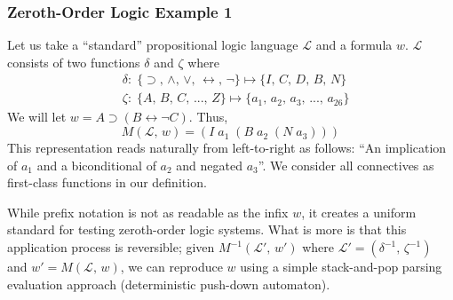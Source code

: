 \documentclass[ms]{uncgdissertationexp2}
\theoremstyle{plain}
\theoremstyle{definition}
\theoremstyle{remark}
\begin{document}
\subsubsection{Zeroth-Order Logic Example 1}
\label{zerothorderlogicexample1}
Let us take a ``standard'' propositional logic language $\mathcal{L}$ and a formula $w$. $\mathcal{L}$ consists of two functions $\delta$ and $\zeta$ where
\begin{align*}
	  & \delta:\;\{\supset,\,\land,\,\lor,\,\leftrightarrow,\,\lnot\}\mapsto \{I,\,C,\,D,\,B,\,N\} \\
	  & \zeta:\;\{A,\,B,\,C,\,...,\,Z\} \mapsto \{a_{1},\,a_{2},\,a_{3},\,...,\,a_{26}\}                                   
\end{align*}
We will let $w = A \supset (B \leftrightarrow \lnot C)$. Thus, 
\[
	M(\mathcal{L},\,w) = (I\;a_{1}\;(B\;a_{2}\;(N\;a_{3})))
\]
This representation reads naturally from left-to-right as follows: ``An implication of $a_1$ and a biconditional of $a_2$ and negated $a_3$''. We consider all connectives as first-class functions in our definition.

While prefix notation is not as readable as the infix $w$, it creates a uniform standard for testing zeroth-order logic systems. What is more is that this application process is reversible; given $M^{-1}(\mathcal{L}',\,w')$ where $\mathcal{L}' = (\delta^{-1},\,\zeta^{-1})$ and $w' = M(\mathcal{L},\,w)$, we can reproduce $w$ using a simple stack-and-pop parsing evaluation approach (deterministic push-down automaton).
    
\end{document}
